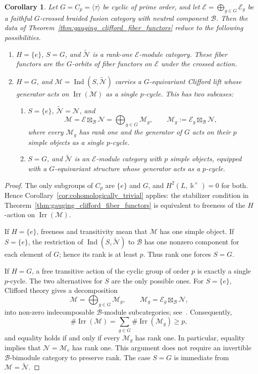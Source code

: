 \documentclass[12pt]{amsart}
\theoremstyle{plain}
\newtheorem{corollary}[theorem]{Corollary}
\theoremstyle{definition} %
\theoremstyle{remark} %
\newcommand{\ku}{{\Bbbk}} %
\newcommand{\cB}{\mathcal{B}}
\newcommand{\cE}{\mathcal{E}}
\newcommand{\cM}{\mathcal{M}}
\newcommand{\cN}{\mathcal{N}}
\newcommand{\Irr}{\operatorname{Irr}}
\DeclareMathOperator{\Ind}{Ind}
\begin{document}
\begin{corollary}\label{cor:prime_cyclic_gauging}
Let $G=C_p=\langle \tau\rangle$ be cyclic of prime order, and let $\cE=\bigoplus_{g\in G}\cE_g$ be a faithful $G$-crossed braided fusion category with neutral component $\cB$. Then the data of Theorem~\ref{thm:gauging_clifford_fiber_functors} reduce to the following possibilities.

\begin{enumerate}
\item $H=\{e\}$, $S=G$, and $\widetilde{\cN}$ is a rank-one $\cE$-module category. These fiber functors are the $G$-orbits of fiber functors on $\cE$ under the crossed action.

\item $H=G$, and $\cM=\Ind(S,\widetilde{\cN})$ carries a $G$-equivariant Clifford lift whose generator acts on $\Irr(\cM)$ as a single $p$-cycle. This has two subcases:
\begin{enumerate}
\item $S=\{e\}$, $\widetilde{\cN}=\cN$, and
\[
\cM=\cE\boxtimes_{\cB}\cN
=\bigoplus_{g\in G}\cM_g,
\qquad
\cM_g:=\cE_g\boxtimes_{\cB}\cN,
\]
where every $\cM_g$ has rank one and the generator of $G$ acts on their $p$ simple objects as a single $p$-cycle.
\item $S=G$, and $\widetilde{\cN}$ is an $\cE$-module category with $p$ simple objects, equipped with a $G$-equivariant structure whose generator acts as a $p$-cycle.
\end{enumerate}
\end{enumerate}
\end{corollary}

\begin{proof}
The only subgroups of $C_p$ are $\{e\}$ and $G$, and $H^2(L,\ku^\times)=0$ for both. Hence Corollary~\ref{cor:cohomologically_trivial} applies: the stabilizer condition in Theorem~\ref{thm:gauging_clifford_fiber_functors} is equivalent to freeness of the $H$-action on $\Irr(\cM)$.

If $H=\{e\}$, freeness and transitivity mean that $\cM$ has one simple object. If $S=\{e\}$, the restriction of $\Ind(S,\widetilde{\cN})$ to $\cB$ has one nonzero component for each element of $G$; hence its rank is at least $p$. Thus rank one forces $S=G$.

If $H=G$, a free transitive action of the cyclic group of order $p$ is exactly a single $p$-cycle. The two alternatives for $S$ are the only possible ones. For $S=\{e\}$, Clifford theory gives a decomposition
\[
\cM=\bigoplus_{g\in G}\cM_g,
\qquad
\cM_g=\cE_g\boxtimes_{\cB}\cN,
\]
into non-zero indecomposable $\cB$-module subcategories; see~\cite[Proposition~4.1]{Gal12}. Consequently,
\[
\#\Irr(\cM)=\sum_{g\in G}\#\Irr(\cM_g)\ge p,
\]
and equality holds if and only if every $\cM_g$ has rank one. In particular, equality implies that $\cN=\cM_e$ has rank one. This argument does not require an invertible $\cB$-bimodule category to preserve rank. The case $S=G$ is immediate from $\cM=\widetilde{\cN}$.
\end{proof}
\end{document}
